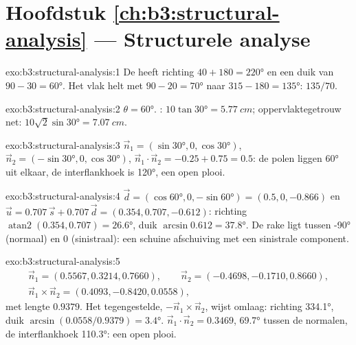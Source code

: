 \section*{Hoofdstuk \ref{ch:b3:structural-analysis} --- Structurele analyse}

\begin{solution}{exo:b3:structural-analysis:1}
De  heeft richting $40 + 180 = \ang{220}$ en een duik van $90 - 30 = \ang{60}$. Het
vlak helt met $90 - 20 = \ang{70}$ naar $315 - 180 = \ang{135}$: $135/70$.
\end{solution}

\begin{solution}{exo:b3:structural-analysis:2}
$\theta = \ang{60}$. : $10\tan\ang{30} = \qty{5.77}{cm}$;
oppervlaktegetrouw net: $10\sqrt2\sin\ang{30} = \qty{7.07}{cm}$.
\end{solution}

\begin{solution}{exo:b3:structural-analysis:3}
$\vec n_1 = (\sin\ang{30}, 0, \cos\ang{30})$, $\vec n_2 = (-\sin\ang{30}, 0,
\cos\ang{30})$, $\vec n_1\cdot\vec n_2 = -0.25 + 0.75 = 0.5$: de polen liggen
\ang{60} uit elkaar, de interflankhoek is \ang{120}, een open plooi.\par
\end{solution}

\begin{solution}{exo:b3:structural-analysis:4}
$\vec d = (\cos\ang{60}, 0, -\sin\ang{60}) = (0.5, 0, -0.866)$ en $\vec u =
0.707\,\vec s + 0.707\,\vec d = (0.354, 0.707, -0.612)$: richting
$\operatorname{atan2}(0.354, 0.707) = \ang{26.6}$, duik $\arcsin0.612 =
\ang{37.8}$. De rake ligt tussen \ang{-90} (normaal) en 0 (sinistraal): een
schuine afschuiving met een sinistrale component.
\end{solution}

\begin{solution}{exo:b3:structural-analysis:5}
\begin{gather*}
  \vec n_1 = (0.5567, 0.3214, 0.7660),\qquad \vec n_2 = (-0.4698, -0.1710, 0.8660),\\
  \vec n_1\times\vec n_2 = (0.4093, -0.8420, 0.0558),
\end{gather*}
\sloppy met lengte $0.9379$. Het tegengestelde, $-\vec n_1\times\vec n_2$, wijst omlaag:
richting \ang{334.1}, duik $\arcsin(0.0558/0.9379) = \ang{3.4}$. $\vec n_1\cdot\vec
n_2 = 0.3469$, \ang{69.7} tussen de normalen, de interflankhoek \ang{110.3}:
een open plooi.\par
\end{solution}

